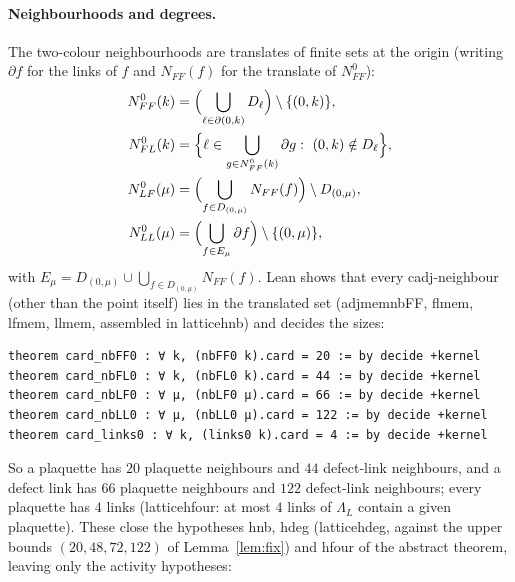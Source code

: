 \documentclass[11pt,a4paper]{article}
\theoremstyle{definition}
\theoremstyle{remark}
\DeclareRobustCommand{\lean}[1]{{\ttfamily\renewcommand{\_}{\textunderscore\allowbreak}#1}}
\newenvironment{leanquote}{\par\smallskip\footnotesize}{\par\smallskip}
\begin{document}
\paragraph{Neighbourhoods and degrees.} The two-colour neighbourhoods are translates of finite sets at the origin (writing $\partial f$ for the links of $f$ and $N_{FF}(f)$ for the translate of $N_{FF}^0$):
\begin{align*}
N_{FF}^0(k)&=\Bigl(\bigcup_{\ell\in\partial(0,k)}D_\ell\Bigr)\setminus\{(0,k)\},\\
N_{FL}^0(k)&=\Bigl\{\ell\in\bigcup_{g\in N_{FF}^0(k)}\partial g:\ (0,k)\notin D_\ell\Bigr\},\\
N_{LF}^0(\mu)&=\Bigl(\bigcup_{f\in D_{(0,\mu)}}N_{FF}(f)\Bigr)\setminus D_{(0,\mu)},\\
N_{LL}^0(\mu)&=\Bigl(\bigcup_{f\in E_\mu}\partial f\Bigr)\setminus\{(0,\mu)\},
\end{align*}
with $E_\mu=D_{(0,\mu)}\cup\bigcup_{f\in D_{(0,\mu)}}N_{FF}(f)$.
Lean shows that every \lean{cadj}-neighbour (other than the point itself) lies in the translated set (\lean{adj\_mem\_nbFF}, \lean{fl\_mem}, \lean{lf\_mem}, \lean{ll\_mem}, assembled in \lean{lattice\_hnb}) and decides the sizes:
\begin{leanquote}
\begin{verbatim}
theorem card_nbFF0 : ∀ k, (nbFF0 k).card = 20 := by decide +kernel
theorem card_nbFL0 : ∀ k, (nbFL0 k).card = 44 := by decide +kernel
theorem card_nbLF0 : ∀ μ, (nbLF0 μ).card = 66 := by decide +kernel
theorem card_nbLL0 : ∀ μ, (nbLL0 μ).card = 122 := by decide +kernel
theorem card_links0 : ∀ k, (links0 k).card = 4 := by decide +kernel
\end{verbatim}
\end{leanquote}
So a plaquette has $20$ plaquette neighbours and $44$ defect-link neighbours, and a defect link has $66$ plaquette neighbours and $122$ defect-link neighbours; every plaquette has $4$ links (\lean{lattice\_hfour}: at most $4$ links of $\Lambda_L$ contain a given plaquette). These close the hypotheses \lean{hnb}, \lean{hdeg} (\lean{lattice\_hdeg}, against the upper bounds $(20,48,72,122)$ of Lemma~\ref{lem:fix}) and \lean{hfour} of the abstract theorem, leaving only the activity hypotheses:
\end{document}
